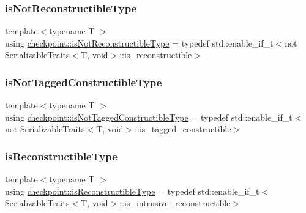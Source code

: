 \mbox{\label{namespacecheckpoint_a0054cbef71b90d6860e1d3916cf9d299}} 
\subsubsection{\texorpdfstring{is\+Not\+Reconstructible\+Type}{isNotReconstructibleType}}
{\footnotesize\ttfamily template$<$typename T $>$ \\
using \hyperlink{namespacecheckpoint_a0054cbef71b90d6860e1d3916cf9d299}{checkpoint\+::is\+Not\+Reconstructible\+Type} = typedef std\+::enable\+\_\+if\+\_\+t$<$not \hyperlink{structcheckpoint_1_1_serializable_traits}{Serializable\+Traits}$<$T, void$>$\+::is\+\_\+reconstructible$>$}

\mbox{\label{namespacecheckpoint_a4eb64ee16bff7ef1609e5b98cb16cfb6}} 
\subsubsection{\texorpdfstring{is\+Not\+Tagged\+Constructible\+Type}{isNotTaggedConstructibleType}}
{\footnotesize\ttfamily template$<$typename T $>$ \\
using \hyperlink{namespacecheckpoint_a4eb64ee16bff7ef1609e5b98cb16cfb6}{checkpoint\+::is\+Not\+Tagged\+Constructible\+Type} = typedef std\+::enable\+\_\+if\+\_\+t$<$not \hyperlink{structcheckpoint_1_1_serializable_traits}{Serializable\+Traits}$<$T, void$>$\+::is\+\_\+tagged\+\_\+constructible$>$}

\mbox{\label{namespacecheckpoint_a126da7cae6bbbec231bb2552dc3ad6cc}} 
\subsubsection{\texorpdfstring{is\+Reconstructible\+Type}{isReconstructibleType}}
{\footnotesize\ttfamily template$<$typename T $>$ \\
using \hyperlink{namespacecheckpoint_a126da7cae6bbbec231bb2552dc3ad6cc}{checkpoint\+::is\+Reconstructible\+Type} = typedef std\+::enable\+\_\+if\+\_\+t$<$\hyperlink{structcheckpoint_1_1_serializable_traits}{Serializable\+Traits}$<$T, void$>$\+::is\+\_\+intrusive\+\_\+reconstructible$>$}

